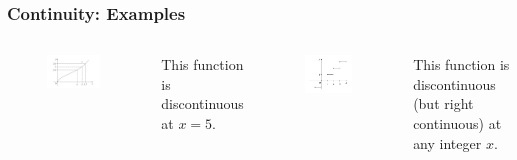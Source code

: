 \documentclass{beamer}
\begin{document}
\begin{frame}
\frametitle{Continuity: Examples}
\begin{columns}[t] %

\vspace*{-0.15in}
\begin{figure}[H]
\centering
\includegraphics[width=6.2cm]{Function-limit-eg.png}
\end{figure}
This function is discontinuous at $x=5$.

\vspace*{-0.15in}
\begin{figure}[H]
\centering
\includegraphics[width=5.5cm]{Function-cont-eg.png}
\end{figure}
\vspace*{-0.1in}
This function is discontinuous (but right continuous) at any integer $x$.

\end{columns}
\end{frame}

\end{document}
